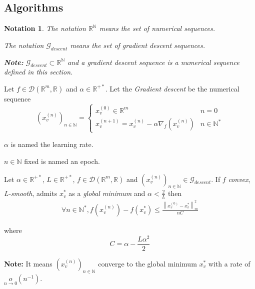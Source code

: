 \documentclass[11pt,en]{elegantpaper}
\newtheorem{notation}{Notation}
\newcommand{\norm}[1]{\left\lVert#1\right\rVert}
\newcommand{\Real}{\mathbb{R}}
\begin{document}
\subsection{Algorithms}

\begin{notation}
  The notation $\Real^{\mathbb{N}}$ means the set of numerical sequences. \par
  The notation $\mathcal{G}_{descent}$ means the set of gradient descent sequences. \par
  \textbf{Note:} $\mathcal{G}_{descent} \subset \Real^{\mathbb{N}}$ and a gradient descent sequence is a
  numerical sequence defined in this section.
\end{notation}

\begin{definition}
  Let $f \in \mathcal{D}(\Real^m,\Real)$ and $\alpha \in \Real^{+*}$. Let the \textit{Gradient descent}
  be the numerical sequence \begin{equation}\label{def:vanilla_grad_descent}
    (x_v^{(n)})_{n \in \mathbb{N}} = \left\{
      \begin{array}{ll}
        x_v^{(0)} \in \Real^m & n = 0 \\
        x_v^{(n+1)} = x_v^{(n)} - \alpha \nabla_f(x_v^{(n)}) & n \in \mathbb{N}^*
      \end{array}
    \right.
  \end{equation} \par

  $\alpha$ is named the learning rate. \par
  $n \in \mathbb{N}$ fixed is named an epoch.
\end{definition}

\begin{proposition}
  {\normalfont
    Let $\alpha \in \Real^{+*}$, $L \in \Real^{+*}$, $f \in \mathcal{D}(\Real^m,\Real)$ and $(x_v^{(n)})_{n \in \mathbb{N}} \in \mathcal{G}_{descent}$.
    If $f$ \textit{convex}, \textit{L-smooth}, admits $x_v^*$ as a \textit{global minimum} and $\alpha < \frac{2}{L}$ then \begin{equation*}
      \begin{gathered}
        \forall n \in \mathbb{N}^*, f(x_v^{(n)}) - f(x_v^*) \leq \frac{\norm{x_v^{(0)} - x_v^*}^2_m}{nC}
      \end{gathered}
    \end{equation*} \par where \begin{equation*}
      C = \alpha - \frac{L\alpha^2}{2}
    \end{equation*}
  
    \textbf{Note:} It means $(x_v^{(n)})_{n \in \mathbb{N}}$ converge to the global minimum $x_v^*$ with a rate of $\underset{n \to 0}{o}(n^{-1})$.
  }
\end{proposition}
\end{document}
